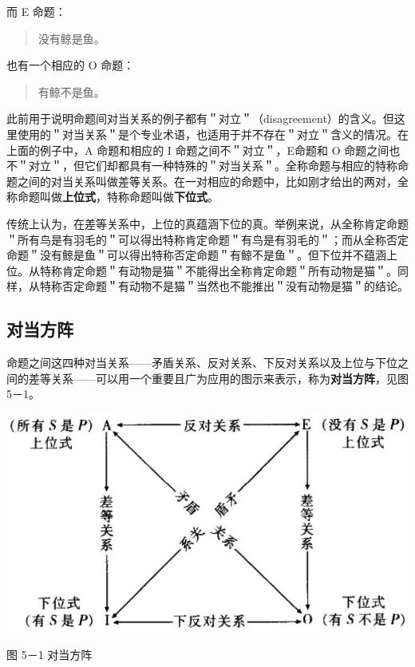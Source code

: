 而 E 命题：

\begin{quote}
没有鲸是鱼。
\end{quote}

也有一个相应的 O 命题：

\begin{quote}
有鲸不是鱼。
\end{quote}

此前用于说明命题间对当关系的例子都有＂对立＂（disagreement）的含义。但这里使用的＂对当关系＂是个专业术语，也适用于并不存在＂对立＂含义的情况。在上面的例子中，A 命题和相应的 I 命题之间不＂对立＂，E命题和 O 命题之间也不＂对立＂，但它们却都具有一种特殊的＂对当关系＂。全称命题与相应的特称命题之间的对当关系叫做差等关系。在一对相应的命题中，比如刚才给出的两对，全称命题叫做\textbf{上位式}，特称命题叫做\textbf{下位式}。

传统上认为，在差等关系中，上位的真蕴涵下位的真。举例来说，从全称肯定命题＂所有鸟是有羽毛的＂可以得出特称肯定命题＂有鸟是有羽毛的＂；而从全称否定命题＂没有鲸是鱼＂可以得出特称否定命题＂有鲸不是鱼＂。但下位并不蕴涵上位。从特称肯定命题＂有动物是猫＂不能得出全称肯定命题＂所有动物是猫＂。同样，从特称否定命题＂有动物不是猫＂当然也不能推出＂没有动物是猫＂的结论。

\subsection{对当方阵}
命题之间这四种对当关系——矛盾关系、反对关系、下反对关系以及上位与下位之间的差等关系——可以用一个重要且广为应用的图示来表示，称为\textbf{对当方阵}，见图 5－1。

\begin{center}
\includegraphics[width=\textwidth]{images/2025_05_15_6a28331d5e7c993ad07ag-238.jpg}

图 5－1 对当方阵
\end{center}

